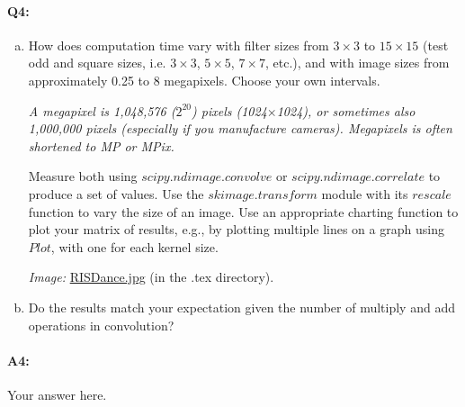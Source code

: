 
\pagebreak
\paragraph{Q4:} 
\begin{enumerate}[(a)]
    \item 
How does computation time vary with filter sizes from $3\times3$ to $15\times15$ (test odd and square sizes, i.e. $3\times3$, $5\times5$, $7\times7$, etc.), and with image sizes from approximately 0.25 to 8 megapixels. Choose your own intervals.

\emph{A megapixel is 1,048,576 ($2^20$) pixels (1024$\times$1024), or sometimes also 1,000,000 pixels (especially if you manufacture cameras). Megapixels is often shortened to MP or MPix.}

Measure both using \href{https://docs.scipy.org/doc/scipy/reference/generated/scipy.ndimage.convolve.html}{$scipy.ndimage.convolve$} or \href{https://docs.scipy.org/doc/scipy/reference/generated/scipy.ndimage.correlate.html}{$scipy.ndimage.correlate$} to produce a set of values. Use the \href{http://scikit-image.org/docs/dev/auto_examples/transform/plot_rescale.html}{$skimage.transform$} module with its {$rescale$} function to vary the size of an image. Use an appropriate charting function to plot your matrix of results, e.g., by plotting multiple lines on a graph using \href{https://matplotlib.org/api/_as_gen/matplotlib.pyplot.plot.html}{$Plot$}, with one for each kernel size.

\emph{Image:} \href{RISDance.jpg}{RISDance.jpg} (in the .tex directory).

\item
    Do the results match your expectation given the number of multiply and add operations in convolution?
\end{enumerate}

\paragraph{A4:} Your answer here.




